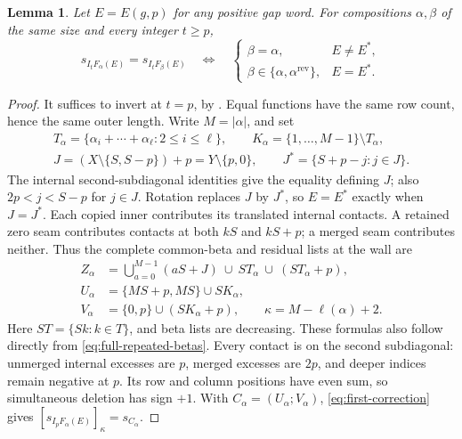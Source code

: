 \documentclass[11pt,a4paper]{amsart}
\numberwithin{equation}{section}
\theoremstyle{plain}
\newtheorem{lemma}[theorem]{Lemma}
\theoremstyle{definition}
\begin{document}
\begin{lemma}\label{lem:balanced-wall}
Let \(E=E(g,p)\) for any positive gap word.  For compositions
\(\alpha,\beta\) of the same size and every integer \(t\ge p\),
\[
 s_{I_tF_\alpha(E)}=s_{I_tF_\beta(E)}
 \quad\Longleftrightarrow\quad
 \begin{cases}
 \beta=\alpha,&E\ne E^*,\\
 \beta\in\{\alpha,\alpha^{\mathrm{rev}}\},&E=E^*.
 \end{cases}
\]
\end{lemma}

\begin{proof}
It suffices to invert at \(t=p\), by .
Equal functions have the same row count, hence the same outer length.
Write \(M=|\alpha|\), and set
\begin{equation}\label{eq:balanced-sets}
 \begin{gathered}
 T_\alpha=\{\alpha_i+\cdots+\alpha_\ell:2\le i\le\ell\},
 \qquad K_\alpha=\{1,\ldots,M-1\}\setminus T_\alpha,\\
 J=(X\setminus\{S,S-p\})+p=Y\setminus\{p,0\},
 \qquad J^*=\{S+p-j:j\in J\}.
 \end{gathered}
\end{equation}
The internal second-subdiagonal identities give the equality defining
\(J\); also \(2p<j<S-p\) for \(j\in J\).
Rotation replaces \(J\) by \(J^*\), so \(E=E^*\) exactly
when \(J=J^*\).  Each copied inner contributes its translated
internal contacts.  A retained zero seam contributes contacts at both
\(kS\) and \(kS+p\); a merged seam contributes neither.
Thus the complete common-beta and residual lists at the wall are
\begin{equation}\label{eq:balanced-deletion}
 \begin{aligned}
 Z_\alpha&=\bigcup_{a=0}^{M-1}(aS+J)
                 \ \cup\ ST_\alpha\ \cup\ (ST_\alpha+p),\\
 U_\alpha&=\{MS+p,MS\}\cup SK_\alpha,\\
 V_\alpha&=\{0,p\}\cup(SK_\alpha+p),
 \qquad \kappa=M-\ell(\alpha)+2.
 \end{aligned}
\end{equation}
Here \(ST=\{Sk:k\in T\}\), and beta lists are decreasing.
These formulas also follow directly from
\eqref{eq:full-repeated-betas}.  Every contact is on the second
subdiagonal: unmerged internal excesses are \(p\), merged excesses
are \(2p\), and deeper indices remain negative at \(p\).
Its row and column positions have even sum, so simultaneous deletion
has sign \(+1\).  With \(C_\alpha=(U_\alpha;V_\alpha)\),
\eqref{eq:first-correction} gives
\([s_{I_pF_\alpha(E)}]_\kappa=s_{C_\alpha}\).


\end{proof}
\end{document}
